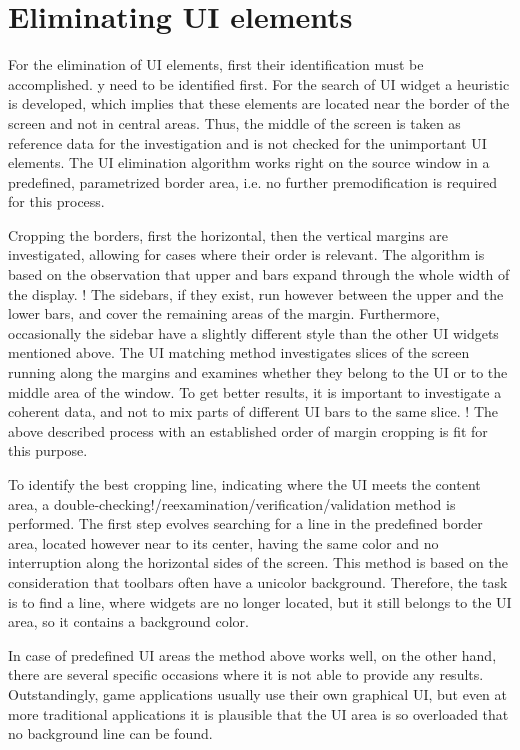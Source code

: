 \documentclass[draft,final]{vutinfth} %
\begin{document}
	\section{Eliminating UI elements}
	For the elimination of UI elements, first their identification must be accomplished. y need to be identified first.
	For the search of UI widget a heuristic is developed, which implies that these elements are located near the border of the screen and not in central areas.
	Thus, the middle of the screen is taken as reference data for the investigation and is not checked for the unimportant UI elements.
	The UI elimination algorithm works right on the source window in a predefined, parametrized border area, i.e. no further premodification is required for this process.\par
	Cropping the borders, first the horizontal, then the vertical margins are investigated, allowing for cases where their order is relevant.
	The algorithm is based on the observation that upper and bars expand through the whole width of the display.
	! The sidebars, if they exist, run however between the upper and the lower bars, and cover the remaining areas of the margin.
	Furthermore, occasionally the sidebar have a slightly different style than the other UI widgets mentioned above.
	The UI matching method investigates slices of the screen running along the margins and examines whether they belong to the UI or to the middle area of the window.
	To get better results, it is important to investigate a coherent data, and not to mix parts of different UI bars to the same slice.
	! The above described process with an established order of margin cropping is fit for this purpose. \par 
	To identify the best cropping line, indicating where the UI meets the content area, a double-checking!/reexamination/verification/validation method is performed.
	The first step evolves searching for a line in the predefined border area, located however near to its center, having the same color and no interruption along the horizontal sides of the screen.
	This method is based on the consideration that toolbars often have a unicolor background.
	Therefore, the task is to find a line, where widgets are no longer located, but it still belongs to the UI area, so it contains a background color.\par
	In case of predefined UI areas the method above works well, on the other hand, there are several specific occasions where it is not able to provide any results.
	Outstandingly, game applications usually use their own graphical UI, but even at more traditional applications it is plausible that the UI area is so overloaded that no background line can be found.
\end{document}
